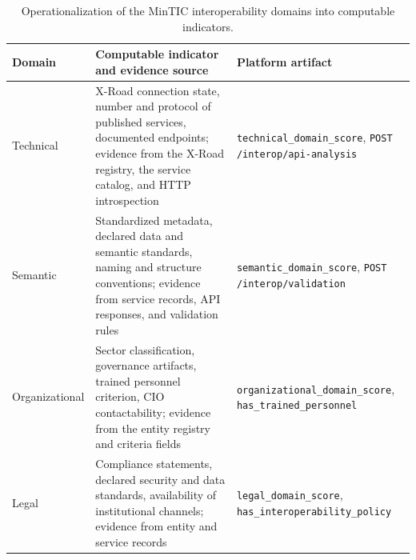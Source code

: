 \documentclass[runningheads]{llncs}
\begin{document}
\begin{table}[t]
\caption{Operationalization of the MinTIC interoperability domains into
computable indicators.}
\label{tab:domains}
\centering
\setlength{\tabcolsep}{4pt}
\scriptsize
\begin{tabular}{p{2.1cm}p{5.3cm}p{3.6cm}}
\toprule
Domain & Computable indicator and evidence source & Platform artifact \\
\midrule
Technical & X-Road connection state, number and protocol of published
services, document\-ed endpoints; evidence from the X-Road registry, the
service catalog, and HTTP introspection &
\texttt{technical\_domain\_score},
\texttt{POST /interop/api-analysis} \\
\addlinespace
Semantic & Standardized metadata, declared data and semantic standards,
naming and structure conventions; evidence from service records, API
responses, and validation rules &
\texttt{semantic\_domain\_score},
\texttt{POST /interop/validation} \\
\addlinespace
Organizational & Sector classification, governance artifacts, trained
personnel criterion, CIO contactability; evidence from the entity registry and
criteria fields &
\texttt{organizational\_domain\_score},
\texttt{has\_trained\_personnel} \\
\addlinespace
Legal & Compliance statements, declared security and data standards,
availability of institutional channels; evidence from entity and service
records &
\texttt{legal\_domain\_score},
\texttt{has\_interoperability\_policy} \\
\bottomrule
\end{tabular}
\end{table}
\end{document}
